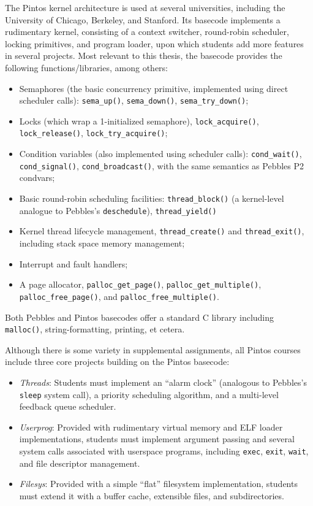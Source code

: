 The Pintos kernel architecture \cite{pintos} is used at several universities, including the University of Chicago, Berkeley, and Stanford.
Its basecode implements a rudimentary kernel, consisting of a context switcher, round-robin scheduler, locking primitives, and program loader,
upon which students add more features in several projects.
Most relevant to this thesis, the basecode provides the following functions/libraries, among others:
\begin{itemize}
	\item Semaphores (the basic concurrency primitive, implemented using direct scheduler calls): {\tt sema\_up()}, {\tt sema\_down()}, {\tt sema\_try\_down()};
	\item Locks (which wrap a 1-initialized semaphore), {\tt lock\_acquire()}, {\tt lock\_\allowbreak{}release()}, {\tt lock\_try\_acquire()};
	\item Condition variables (also implemented using scheduler calls): {\tt cond\_wait()}, {\tt cond\_\allowbreak{}signal()}, {\tt cond\_broadcast()}, with the same semantics as Pebbles P2 condvars;
	\item Basic round-robin scheduling facilities: {\tt thread\_block()} (a kernel-level analogue to Pebbles's {\tt deschedule}), {\tt thread\_yield()}
	\item Kernel thread lifecycle management, {\tt thread\_create()} and {\tt thread\_exit()}, including stack space memory management;
	\item Interrupt and fault handlers;
	\item A page allocator, {\tt palloc\_get\_page()}, {\tt palloc\_get\_multiple()}, {\tt palloc\_free\_page()}, and {\tt palloc\_free\_multiple()}.
\end{itemize}
Both Pebbles and Pintos basecodes offer a standard C library including {\tt malloc()}, string-formatting, printing, et cetera.

Although there is some variety in supplemental assignments, all Pintos courses include three core projects building on the Pintos basecode:
\begin{itemize}
	\item {\em Threads}: Students must implement an ``alarm clock'' (analogous to Pebbles's {\tt sleep} system call),
		a priority scheduling algorithm, and a multi-level feedback queue scheduler.
	\item {\em Userprog}: Provided with rudimentary virtual memory and ELF loader implementations, students must implement argument passing and several system calls associated with userspace programs, including {\tt exec}, {\tt exit}, {\tt wait}, and file descriptor management.
	\item {\em Filesys}: Provided with a simple ``flat'' filesystem implementation, students must extend it with a buffer cache, extensible files, and subdirectories.
\end{itemize}

